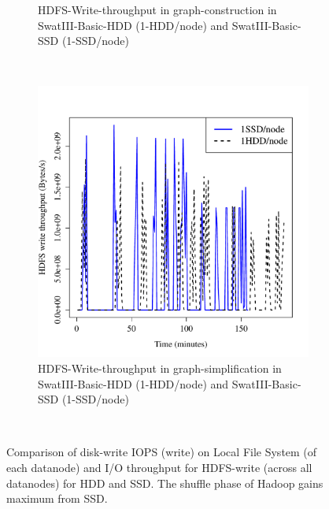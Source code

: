 \documentclass[conference]{IEEEtran}
\begin{document}
\begin{figure}[htb]
\begin{subfigure}[b]{0.23\textwidth}
                \caption{HDFS-Write-throughput in graph-construction in SwatIII-Basic-HDD (1-HDD/node) and SwatIII-Basic-SSD (1-SSD/node)}
                \label{fig:BGHddSsdHdfsWrIops}
        \end{subfigure}
        ~ %
        \begin{subfigure}[b]{0.23\textwidth}
                \includegraphics[width=\textwidth]{Figure/SystemData/Plots/ECHddSsdHdfsWrIops.pdf}
                \caption{HDFS-Write-throughput in graph-simplification in SwatIII-Basic-HDD (1-HDD/node) and SwatIII-Basic-SSD (1-SSD/node)}
                \label{fig:ECHddSsdHdfsWrIops}
        \end{subfigure}
        ~ %
        \caption{Comparison of disk-write IOPS (write) on Local File System (of each datanode) and I/O throughput for HDFS-write (across all datanodes) for HDD and SSD. The shuffle phase of Hadoop gains maximum from SSD.}\label{fig:HddSsdHdfsRWps}   
        \vspace{-1.5em}
\end{figure}
\end{document}
